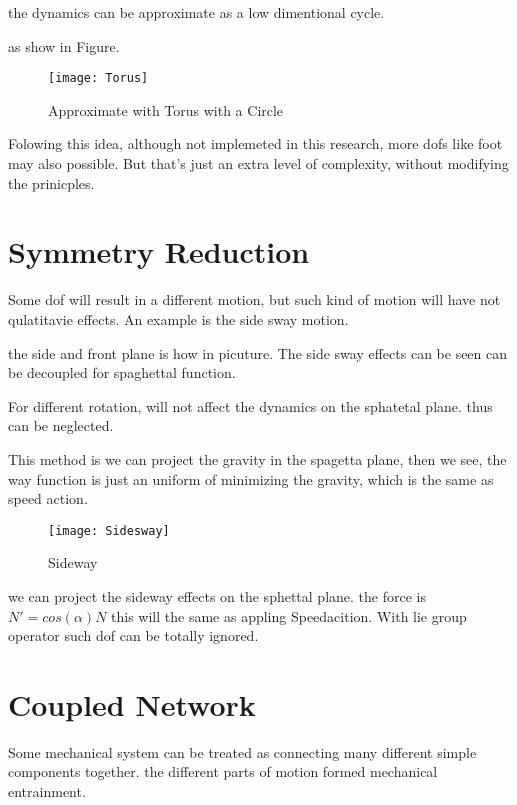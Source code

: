 the dynamics can be approximate as a low dimentional cycle.

as show in Figure.

\begin{figure}[!htbp]
  \begin{center}
      \texttt{[image: Torus]}
    \caption{Approximate with Torus with a Circle}
    \label{fig:approximate}
\end{center}
\end{figure}


Folowing this idea, although not implemeted in this research, more dofs like foot may also possible.
But that's just an extra level of complexity, without modifying the prinicples. 
\section{Symmetry Reduction}
Some dof will result in a different motion, but such kind of motion will have not qulatitavie effects.
An example is the side sway motion.

the side and front plane is how in picuture.
The side sway effects can be seen can be decoupled for spaghettal function.


For different rotation, will not affect the dynamics on the sphatetal plane.
thus can be neglected.

This method is we can project the gravity in the spagetta plane,
then we see, the way function is just an uniform of minimizing the gravity,
which is the same as speed action.

\begin{figure}[!htbp]
  \begin{center}
      \texttt{[image: Sidesway]}
    \caption{Sideway}
    \label{fig:sidesway}
\end{center}
\end{figure}


we can project the sideway effects on the sphettal plane. the force is $N'=cos(\alpha)N$
this will the same as appling Speedacition.
With lie group operator such dof can be totally ignored.

\section{Coupled Network}
Some mechanical system can be treated as connecting many different simple components together.
the different parts of motion formed mechanical entrainment.


